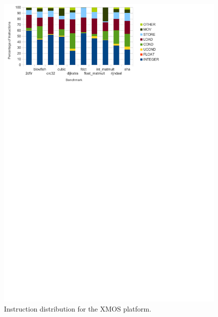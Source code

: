 \documentclass[twocolumn]{article}
\begin{document}
\begin{figure}[t]
	\includegraphics[width=\linewidth,clip, trim=0 8.5in 2in 0]{xmos.pdf}
	\caption{Instruction distribution for the XMOS platform.}
	\label{Fig:InstructionDistributionXMOS}
\end{figure}
\end{document}
